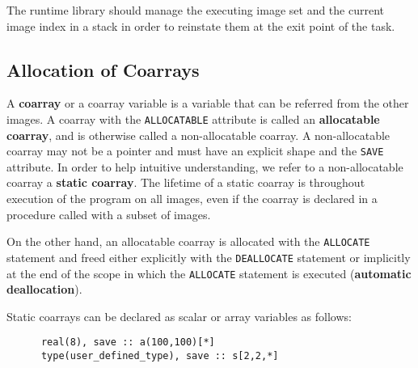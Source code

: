 
\requirement
The runtime library should manage the executing image set and the current image index 
in a stack in order to reinstate them at the exit point of the task.


\subsection{Allocation of Coarrays}\label{sec:spec-coarray}

A {\bf coarray} or a coarray variable is a variable that can be referred from the other images. 
A coarray with the {\tt ALLOCATABLE} attribute is called an {\bf allocatable coarray}, and is
otherwise called a non-allocatable coarray. A non-allocatable coarray may not be a pointer 
and must have an explicit shape and the {\tt SAVE} attribute. In order to help 
intuitive understanding, we refer to a non-allocatable coarray a {\bf static coarray}. 
The lifetime of a static coarray is throughout execution of the program on all images, even if
the coarray is declared in a procedure called with a subset of images.

On the other hand, an allocatable coarray is allocated with the {\tt ALLOCATE} statement and 
freed either explicitly with the {\tt DEALLOCATE} statement or implicitly at the end of the 
scope in which the {\tt ALLOCATE} statement is executed ({\bf automatic deallocation}).

Static coarrays can be declared as scalar or array variables as follows:
\begin{verbatim}
      real(8), save :: a(100,100)[*]
      type(user_defined_type), save :: s[2,2,*]
\end{verbatim}

